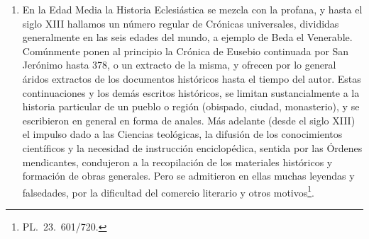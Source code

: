 \raggedbottom{} \documentclass[12pt, a4paper, openany]{book} %
\begin{document}
\begin{enumerate}
Próspero de Aquitania, Victor de Tunun, San Isidoro de Sevilla y San Beda. Con tendencia apologética escribieron crónicas universales Sulpicio Severo (hasta 400) y Paulo Orosio, estimulado por San Agustín (§ 42, n. 9). Cassiodoro hizo en su «Historia Tripartita» un extracto de Sócrates, Sozomeno y Teodoreto, y lo continuó hasta 518. La Edad Media sacó generalmente de Rufino y Cassiodoro, sus conocimientos sobre la Antigüedad eclesiástica. La primera Historia literaria fue el «Lib.\ de viris illustribus», compuesto por San Jerónimo y continuado por Gennadio, San Isidoro de Sevilla y San Ildefonso de Toledo.
  \item En la Edad Media la Historia Eclesiástica se mezcla con la profana, y hasta el siglo XIII hallamos un número regular de Crónicas universales, divididas generalmente en las seis edades del mundo, a ejemplo de Beda el Venerable. Comúnmente ponen al principio la Crónica de Eusebio continuada por San Jerónimo hasta 378, o un extracto de la misma, y ofrecen por lo general áridos extractos de los documentos históricos hasta el tiempo del autor. Estas continuaciones y los demás escritos históricos, se limitan sustancialmente a la historia particular de un pueblo o región (obispado, ciudad, monasterio), y se escribieron en general en forma de anales. Más adelante (desde el siglo XIII) el impulso dado a las Ciencias teológicas, la difusión de los conocimientos científicos y la necesidad de instrucción enciclopédica, sentida por las Órdenes mendicantes, condujeron a la recopilación de los materiales históricos y formación de obras generales. Pero se admitieron en ellas muchas leyendas y falsedades, por la dificultad del comercio literario y otros motivos\footnote{PL.\ 23.\ 601/720.}.


\end{enumerate}
\end{document}
